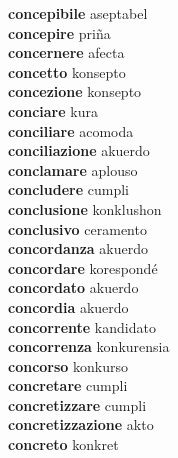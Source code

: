 \textbf{concepibile } aseptabel \\
\textbf{concepire } priña \\
\textbf{concernere } afecta \\
\textbf{concetto } konsepto \\
\textbf{concezione } konsepto \\
\textbf{conciare } kura \\
\textbf{conciliare } acomoda \\
\textbf{conciliazione } akuerdo \\
\textbf{conclamare } aplouso \\
\textbf{concludere } cumpli \\
\textbf{conclusione } konklushon \\
\textbf{conclusivo } ceramento \\
\textbf{concordanza } akuerdo \\
\textbf{concordare } korespondé \\
\textbf{concordato } akuerdo \\
\textbf{concordia } akuerdo \\
\textbf{concorrente } kandidato \\
\textbf{concorrenza } konkurensia \\
\textbf{concorso } konkurso \\
\textbf{concretare } cumpli \\
\textbf{concretizzare } cumpli \\
\textbf{concretizzazione } akto \\
\textbf{concreto } konkret \\
